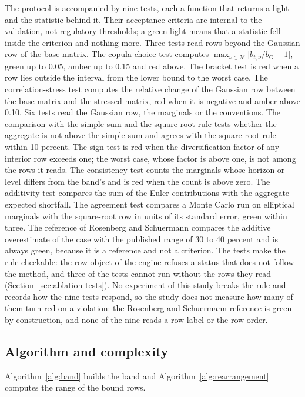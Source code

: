 The protocol is accompanied by nine tests, each a function that returns a light and the statistic behind it. Their acceptance
criteria are internal to the validation, not regulatory thresholds; a green light means that a statistic fell inside the criterion
and nothing more. Three tests read rows beyond the Gaussian row of the base matrix. The copula-choice test computes
$\max_{\nu\in\mathcal N}\lvert b_{t,\nu}/b_{\mathrm{G}}-1\rvert$, green up to 0.05, amber up to 0.15 and red above. The bracket
test is red when a row lies outside the interval from the lower bound to the worst case. The correlation-stress test computes the
relative change of the Gaussian row between the base matrix and the stressed matrix, red when it is negative and amber above 0.10.
Six tests read the Gaussian row, the marginals or the conventions. The comparison with the simple sum and the square-root rule
tests whether the aggregate is not above the simple sum and agrees with the square-root rule within 10 percent. The sign test is
red when the diversification factor of any interior row exceeds one; the worst case, whose factor is above one, is not among the rows it reads. The consistency test counts the marginals whose horizon or level differs from the
band's and is red when the count is above zero. The additivity test compares the sum of the Euler contributions with the aggregate
expected shortfall. The agreement test compares a Monte Carlo run on elliptical marginals with the square-root row in units of its
standard error, green within three. The reference of Rosenberg and Schuermann compares the additive overestimate of the case with
the published range of 30 to 40 percent and is always green, because it is a reference and not a criterion. The tests make the
rule checkable: the row object of the engine refuses a status that does not follow the method, and three of the tests cannot run
without the rows they read (Section~\ref{sec:ablation-tests}). No experiment of this study breaks the rule and records how the
nine tests respond, so the study does not measure how many of them turn red on a violation: the Rosenberg and Schuermann reference
is green by construction, and none of the nine reads a row label or the row order.

\subsection{Algorithm and complexity}
\label{sec:method-algorithm}

Algorithm~\ref{alg:band} builds the band and Algorithm~\ref{alg:rearrangement} computes the range of the bound rows.

